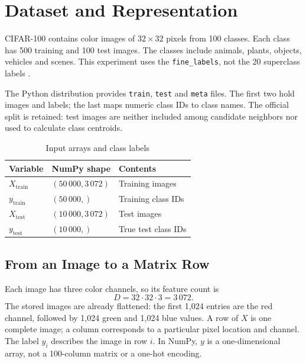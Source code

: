 \documentclass[letterpaper,journal]{IEEEtran}
\newcommand{\code}[1]{\texttt{#1}}
\newcommand{\train}{\mathrm{train}}
\newcommand{\test}{\mathrm{test}}
\begin{document}
\section{Dataset and Representation}
CIFAR-100 contains color images of $32\times32$ pixels from 100 classes.
Each class has 500 training and 100 test images. The classes include animals,
plants, objects, vehicles and scenes. This experiment uses the
\code{fine\_labels}, not the 20 superclass labels \cite{cifar,krizhevsky}.

The Python distribution provides \code{train}, \code{test} and \code{meta}
files. The first two hold images and labels; the last maps numeric class IDs
to class names. The official split is retained: test images are neither
included among candidate neighbors nor used to calculate class centroids.

\begin{table}[t]
\caption{Input arrays and class labels}
\label{tab:shapes}
\centering\small
\begin{tabular}{@{}lll@{}}
\toprule
Variable & NumPy shape & Contents\\
\midrule
$X_{\train}$ & $(50\,000,3\,072)$ & Training images\\
$y_{\train}$ & $(50\,000,)$ & Training class IDs\\
$X_{\test}$ & $(10\,000,3\,072)$ & Test images\\
$y_{\test}$ & $(10\,000,)$ & True test class IDs\\
\bottomrule
\end{tabular}
\end{table}

\subsection{From an Image to a Matrix Row}
Each image has three color channels, so its feature count is
\begin{equation}
D=32\cdot32\cdot3=3\,072.
\end{equation}
The stored images are already flattened: the first 1,024 entries are the red
channel, followed by 1,024 green and 1,024 blue values. A row of $X$ is one
complete image; a column corresponds to a particular pixel location and
channel. The label $y_i$ describes the image in row $i$. In NumPy, $y$ is a
one-dimensional array, not a 100-column matrix or a one-hot encoding.
\end{document}
